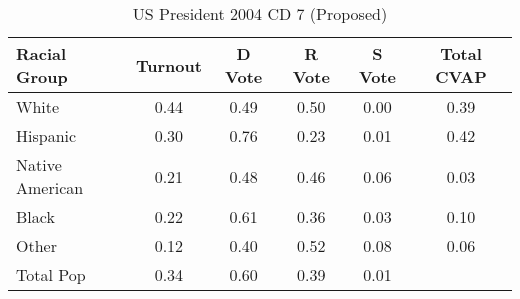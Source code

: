 \begin{table}[htb]
\begin{center}
\caption{US President 2004 CD 7 (Proposed)}
\label{pres04_cvap_cd_7}
\begin{tabular}{lccccc}
  \hline
Racial Group & Turnout & D Vote & R Vote & S Vote & Total CVAP \\ 
  \hline
White & 0.44 & 0.49 & 0.50 & 0.00 & 0.39 \\ 
  Hispanic & 0.30 & 0.76 & 0.23 & 0.01 & 0.42 \\ 
  Native American & 0.21 & 0.48 & 0.46 & 0.06 & 0.03 \\ 
  Black & 0.22 & 0.61 & 0.36 & 0.03 & 0.10 \\ 
  Other & 0.12 & 0.40 & 0.52 & 0.08 & 0.06 \\ 
  Total Pop & 0.34 & 0.60 & 0.39 & 0.01 &  \\ 
   \hline
\end{tabular}
\end{center}
\end{table}
